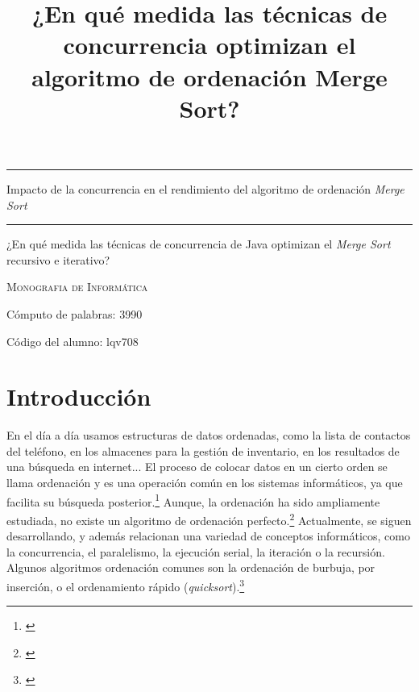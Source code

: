 \documentclass[titlepage]{article}
\title{¿En qué medida las técnicas de concurrencia optimizan el algoritmo de ordenación Merge Sort?}
\begin{document}
	
	
\begin{titlepage}
	\centering
	\hfill
	\vspace{3cm}
	
	\hrule
	\vspace{1cm}
	\onehalfspacing
	{\Huge Impacto de la concurrencia en el rendimiento del algoritmo de ordenación \textit{Merge Sort}\par}
	\vspace{1cm}
	\hrule
	
	\vspace{1cm}
	{\LARGE ¿En qué medida las técnicas de concurrencia de Java optimizan el \textit{Merge Sort} recursivo e iterativo? \par}
	
	\vspace{1cm}
	
	{\scshape\large Monografia de Informática\par}
	
	\vspace{8cm}
	
	{\large Cómputo de palabras: 3990\par}
	{\large Código del alumno: lqv708 \par}
	
	
\end{titlepage}

\newpage
\tableofcontents

\newpage
\section{Introducción} %
En el día a día usamos estructuras de datos ordenadas, como la lista de contactos del teléfono, en los almacenes para la gestión de inventario, en los resultados de una búsqueda en internet... El proceso de colocar datos en un cierto orden se llama ordenación y es una operación común en los sistemas informáticos, ya que facilita su búsqueda posterior.\footnote{\cite{knuth-1997}} Aunque, la ordenación ha sido ampliamente estudiada, no existe un algoritmo de ordenación perfecto.\footnote{\cite{McMillan-2007}} Actualmente, se siguen desarrollando, y además relacionan una variedad de conceptos informáticos, como la concurrencia, el paralelismo, la ejecución serial, la iteración o la recursión. Algunos algoritmos ordenación comunes son la ordenación de burbuja, por inserción, o el ordenamiento rápido (\textit{quicksort}).\footnote{\cite{pandey-2008}}
\end{document}

